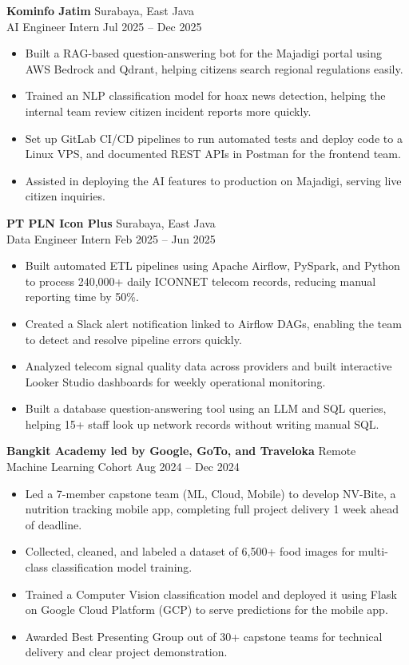 \documentclass[a4paper,10pt]{article}
\begin{document}
\vspace{4pt}
\textbf{Kominfo Jatim} \hfill Surabaya, East Java \\
AI Engineer Intern \hfill Jul 2025 -- Dec 2025
\begin{itemize}
    \item Built a RAG-based question-answering bot for the Majadigi portal using AWS Bedrock and Qdrant, helping citizens search regional regulations easily.
    \item Trained an NLP classification model for hoax news detection, helping the internal team review citizen incident reports more quickly.
    \item Set up GitLab CI/CD pipelines to run automated tests and deploy code to a Linux VPS, and documented REST APIs in Postman for the frontend team.
    \item Assisted in deploying the AI features to production on Majadigi, serving live citizen inquiries.
\end{itemize}

\vspace{4pt}
\textbf{PT PLN Icon Plus} \hfill Surabaya, East Java \\
Data Engineer Intern \hfill Feb 2025 -- Jun 2025
\begin{itemize}
    \item Built automated ETL pipelines using Apache Airflow, PySpark, and Python to process 240,000+ daily ICONNET telecom records, reducing manual reporting time by 50\%.
    \item Created a Slack alert notification linked to Airflow DAGs, enabling the team to detect and resolve pipeline errors quickly.
    \item Analyzed telecom signal quality data across providers and built interactive Looker Studio dashboards for weekly operational monitoring.
    \item Built a database question-answering tool using an LLM and SQL queries, helping 15+ staff look up network records without writing manual SQL.
\end{itemize}

\vspace{4pt}
\textbf{Bangkit Academy led by Google, GoTo, and Traveloka} \hfill Remote \\
Machine Learning Cohort \hfill Aug 2024 -- Dec 2024
\begin{itemize}
    \item Led a 7-member capstone team (ML, Cloud, Mobile) to develop NV-Bite, a nutrition tracking mobile app, completing full project delivery 1 week ahead of deadline.
    \item Collected, cleaned, and labeled a dataset of 6,500+ food images for multi-class classification model training.
    \item Trained a Computer Vision classification model and deployed it using Flask on Google Cloud Platform (GCP) to serve predictions for the mobile app.
    \item Awarded Best Presenting Group out of 30+ capstone teams for technical delivery and clear project demonstration.
\end{itemize}
\end{document}
